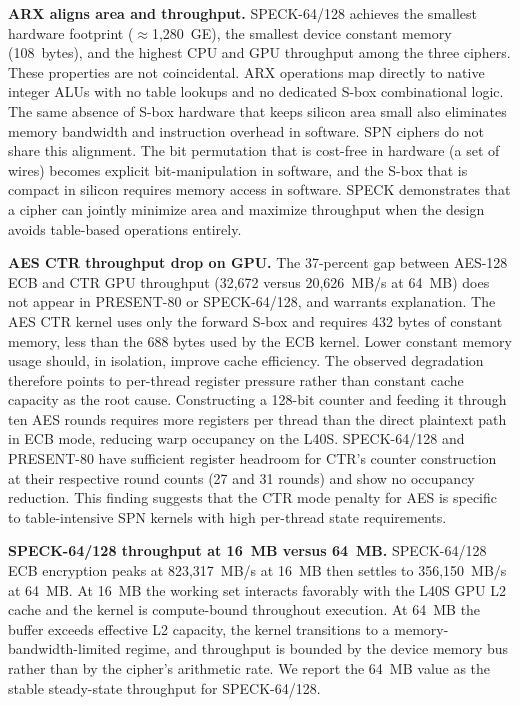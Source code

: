 \documentclass[conference]{IEEEtran}
\begin{document}
\textbf{ARX aligns area and throughput.} SPECK-64/128 achieves the smallest hardware footprint
($\approx$1,280~GE), the smallest device constant memory (108~bytes), and the highest CPU and GPU
throughput among the three ciphers. These properties are not coincidental. ARX operations map
directly to native integer ALUs with no table lookups and no dedicated S-box combinational logic.
The same absence of S-box hardware that keeps silicon area small also eliminates memory bandwidth
and instruction overhead in software. SPN ciphers do not share this alignment. The bit permutation
that is cost-free in hardware (a set of wires) becomes explicit bit-manipulation in software, and
the S-box that is compact in silicon requires memory access in software. SPECK demonstrates that a
cipher can jointly minimize area and maximize throughput when the design avoids table-based
operations entirely.

\textbf{AES CTR throughput drop on GPU.} The 37-percent gap between AES-128 ECB and CTR GPU
throughput (32,672 versus 20,626~MB/s at 64~MB) does not appear in PRESENT-80 or SPECK-64/128,
and warrants explanation. The AES CTR kernel uses only the forward S-box and requires 432 bytes of
constant memory, less than the 688 bytes used by the ECB kernel. Lower constant memory usage
should, in isolation, improve cache efficiency. The observed degradation therefore points to
per-thread register pressure rather than constant cache capacity as the root cause. Constructing a
128-bit counter and feeding it through ten AES rounds requires more registers per thread than the
direct plaintext path in ECB mode, reducing warp occupancy on the L40S. SPECK-64/128 and
PRESENT-80 have sufficient register headroom for CTR's counter construction at their respective
round counts (27 and 31 rounds) and show no occupancy reduction. This finding suggests that the
CTR mode penalty for AES is specific to table-intensive SPN kernels with high per-thread state
requirements.

\textbf{SPECK-64/128 throughput at 16~MB versus 64~MB.} SPECK-64/128 ECB encryption peaks at
823,317~MB/s at 16~MB then settles to 356,150~MB/s at 64~MB. At 16~MB the working set interacts
favorably with the L40S GPU L2 cache and the kernel is compute-bound throughout execution. At 64~MB
the buffer exceeds effective L2 capacity, the kernel transitions to a memory-bandwidth-limited
regime, and throughput is bounded by the device memory bus rather than by the cipher's arithmetic
rate. We report the 64~MB value as the stable steady-state throughput for SPECK-64/128.
\end{document}
